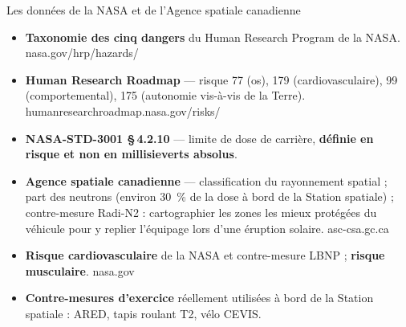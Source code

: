 \documentclass[aspectratio=169,11pt]{beamer}
\newcommand{\src}[1]{{\color{muted}\scriptsize #1}}
\begin{document}
\begin{frame}{Les donn\'ees de la NASA et de l'Agence spatiale canadienne}
\footnotesize
\begin{itemize}
  \item \textbf{Taxonomie des cinq dangers} du Human Research Program de la NASA. \src{nasa.gov/hrp/hazards/}
  \item \textbf{Human Research Roadmap} --- risque 77 (os), 179 (cardiovasculaire), 99 (comportemental), 175 (autonomie vis-\`a-vis de la Terre). \src{humanresearchroadmap.nasa.gov/risks/}
  \item \textbf{NASA-STD-3001 \S\,4.2.10} --- limite de dose de carri\`ere, \textbf{d\'efinie en risque et non en millisieverts absolus}.
  \item \textbf{Agence spatiale canadienne} --- classification du rayonnement spatial ; part des neutrons (environ 30~\% de la dose \`a bord de la Station spatiale) ; contre-mesure Radi-N2 : cartographier les zones les mieux prot\'eg\'ees du v\'ehicule pour y replier l'\'equipage lors d'une \'eruption solaire. \src{asc-csa.gc.ca}
  \item \textbf{Risque cardiovasculaire} de la NASA et contre-mesure LBNP ; \textbf{risque musculaire}. \src{nasa.gov}
  \item \textbf{Contre-mesures d'exercice} r\'eellement utilis\'ees \`a bord de la Station spatiale : ARED, tapis roulant T2, v\'elo CEVIS.
\end{itemize}
\end{frame}
\end{document}
